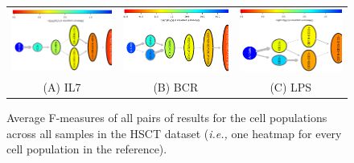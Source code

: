   \begin{landscape}
  \begin{figure}[!ht]
    \begin{center}
      \begin{tabular}{c||c||c}
        \includegraphics[width=4in,angle=270]{figs/rchy/figs/IL7Proportions}&
        \includegraphics[width=4in,angle=270]{figs/rchy/figs/BCRProportions}&
        \includegraphics[width=4in,angle=270]{figs/rchy/figs/LPSProportions}\\
        (A) IL7 &(B) BCR &(C) LPS\\
      \end{tabular}
    \end{center}
    \caption{Average F-measures of all pairs of results for the cell populations across all samples in the HSCT dataset (\emph{i.e.,} one heatmap for every cell population in the reference).}
    \label{CyTOFProp}
  \end{figure}
  \end{landscape}

